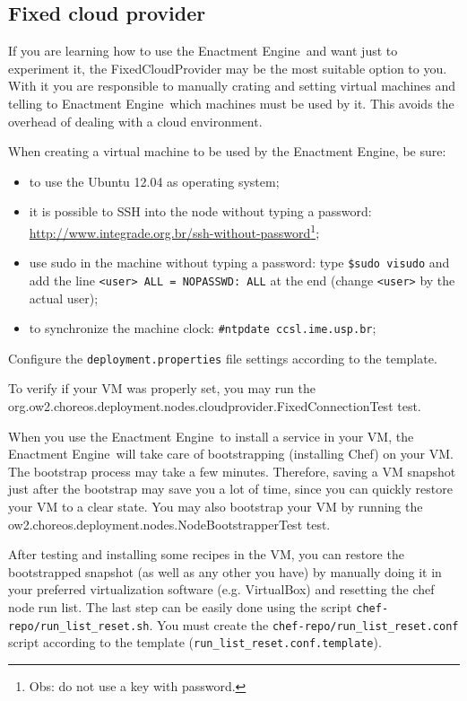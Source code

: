 \documentclass[a4paper, 10pt]{article}
\newcommand{\ee}{Enactment Engine}
\begin{document}
\subsection{Fixed cloud provider}

If you are learning how to use the \ee\ and want just to experiment it, the \textsf{FixedCloudProvider} may be the most suitable option to you. With it you are responsible to manually crating and setting virtual machines and telling to \ee\ which machines must be used by it. This avoids the overhead of dealing with a cloud environment. 

When creating a virtual machine to be used by the \ee, be sure:
\begin{itemize}
\item to use the Ubuntu 12.04 as operating system;
\item it is possible to SSH into the node without typing a password: \url{http://www.integrade.org.br/ssh-without-password}\footnote{Obs: do not use a key with password.};
\item use sudo in the machine without typing a password: type \texttt{\$sudo visudo} and add the line \texttt{<user> ALL = NOPASSWD: ALL} at the end (change \texttt{<user>} by the actual user);
\item to synchronize the machine clock: \texttt{\#ntpdate ccsl.ime.usp.br};
\end{itemize}

Configure the \texttt{deployment.properties} file settings according to the template.

To verify if your VM was properly set, you may run the \\ \textsf{org.ow2.choreos.deployment.nodes.cloudprovider.FixedConnectionTest} test.

When you use the \ee\ to install a service in your VM, the \ee\ will take care of bootstrapping (installing Chef) on your VM. The bootstrap process may take a few minutes. Therefore, saving a VM snapshot just after the bootstrap may save you a lot of time, since you can quickly restore your VM to a clear state. You may also bootstrap your VM by running the \textsf{ow2.choreos.deployment.nodes.NodeBootstrapperTest} test.

After testing and installing some recipes in the VM, you can restore the bootstrapped snapshot (as well as any other you have) by manually doing it in your preferred virtualization software (e.g. VirtualBox) and resetting the chef node run list. The last step can be easily done using the script \texttt{chef-repo/run\_list\_reset.sh}. You must create the \texttt{chef-repo/run\_list\_reset.conf} script according to the template (\texttt{run\_list\_reset.conf.template}).
\end{document}
